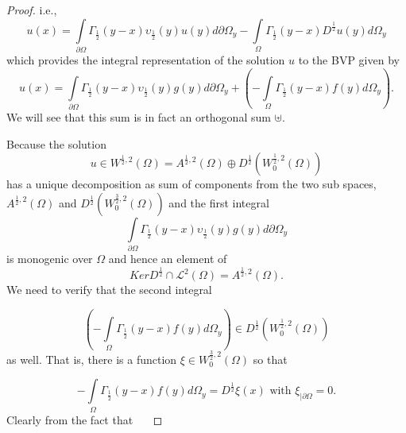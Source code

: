 \documentclass{amsart}%
\theoremstyle{plain}
\numberwithin{equation}{section}
\begin{document}
\begin{proof}
i.e.,
\begin{equation}
u\left(  x\right)  =%
{\displaystyle\int\limits_{\partial\Omega}}
\Gamma_{\frac{1}{2}}\left(  y-x\right)  \upsilon_{\frac{1}{2}}\left(
y\right)  u\left(  y\right)  d\partial\Omega_{y}-%
{\displaystyle\int\limits_{\Omega}}
\Gamma_{\frac{1}{2}}\left(  y-x\right)  D^{\frac{1}{2}}u(y)d\Omega
_{y}\label{borel-pompeiu}%
\end{equation}
which provides the integral representation of the solution $u$ to the BVP
given by
\[
u\left(  x\right)  =%
{\displaystyle\int\limits_{\partial\Omega}}
\Gamma_{\frac{1}{2}}\left(  y-x\right)  \upsilon_{\frac{1}{2}}\left(
y\right)  g(y)d\partial\Omega_{y}+\left(  -%
{\displaystyle\int\limits_{\Omega}}
\Gamma_{\frac{1}{2}}\left(  y-x\right)  f(y)d\Omega_{y}\right)  .
\]
We will see that this sum is in fact an orthogonal sum $\uplus$. \ 

Because the solution
\[
u\in W^{\frac{1}{2},2}\left(  \Omega\right)  =A^{\frac{1}{2},2}\left(
\Omega\right)  \oplus D^{\frac{1}{2}}\left(  W_{0}^{\frac{1}{2},2}\left(
\Omega\right)  \right)
\]
has a unique decomposition as sum of components from the two sub spaces,
$A^{\frac{1}{2},2}\left(  \Omega\right)  $ and $D^{\frac{1}{2}}\left(
W_{0}^{\frac{3}{2},2}\left(  \Omega\right)  \right)  $ and the first integral
\[%
{\displaystyle\int\limits_{\partial\Omega}}
\Gamma_{\frac{1}{2}}\left(  y-x\right)  \upsilon_{\frac{1}{2}}\left(
y\right)  g(y)d\partial\Omega_{y}%
\]
is monogenic over $\Omega$ and hence an element of
\[
KerD^{\frac{1}{2}}\cap%
\mathcal{L}%
^{2}\left(  \Omega\right)  =A^{\frac{1}{2},2}\left(  \Omega\right)  .
\]
We need to verify that the second integral%

\[
\left(  -%
{\displaystyle\int\limits_{\Omega}}
\Gamma_{\frac{1}{2}}\left(  y-x\right)  f(y)d\Omega_{y}\right)  \in
D^{\frac{1}{2}}\left(  W_{0}^{\frac{1}{2},2}\left(  \Omega\right)  \right)
\]
as well. That is, there is a function $\xi\in W_{0}^{\frac{3}{2},2}\left(
\Omega\right)  $ so that%

\[
-%
{\displaystyle\int\limits_{\Omega}}
\Gamma_{\frac{1}{2}}\left(  y-x\right)  f(y)d\Omega_{y}=D^{\frac{1}{2}}%
\xi\left(  x\right)  \text{ \ \ with \ \ }\xi_{\mid\partial\Omega}=0.
\]
Clearly from the fact that \ \ %


\end{proof}
\end{document}
